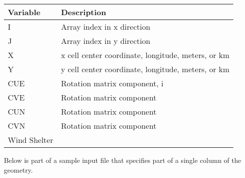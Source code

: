 \documentclass[letterpaper,10pt,english]{sphinxmanual}
\begin{document}
\begin{savenotes}\sphinxattablestart
\centering
\begin{tabulary}{\linewidth}[t]{|T|T|}
\hline
\sphinxstyletheadfamily 
Variable
&\sphinxstyletheadfamily 
Description
\\
\hline
I
&
Array index in x direction
\\
\hline
J
&
Array index in y direction
\\
\hline
X
&
x cell center coordinate, longitude, meters, or km
\\
\hline
Y
&
y cell center coordinate, longitude, meters,  or km
\\
\hline
CUE
&
Rotation matrix component, i
\\
\hline
CVE
&
Rotation matrix component
\\
\hline
CUN
&
Rotation matrix component
\\
\hline
CVN
&
Rotation matrix component
\\
\hline
Wind Shelter
&\\
\hline
\end{tabulary}
\par
\sphinxattableend\end{savenotes}

Below is part of a sample input file that specifies part of a single column of the geometry.
\end{document}
